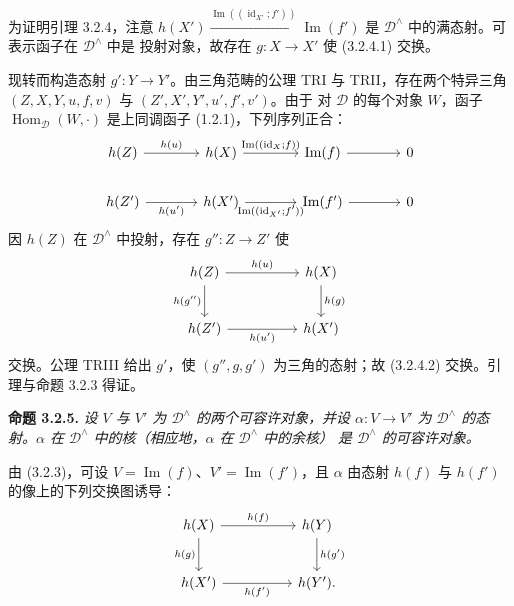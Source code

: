 \clearpage
{}%
\begingroup\small\setlength{\parskip}{0pt}\setlength{\emergencystretch}{1.5em}
为证明引理 3.2.4，注意
$h(X')\xrightarrow{\operatorname{Im}((\operatorname{id}_{X'};f'))}
\operatorname{Im}(f')$ 是 $\mathcal D^\wedge$ 中的满态射。可表示函子在 $\mathcal D^\wedge$ 中是
投射对象，故存在 $g\colon X\to X'$ 使 (3.2.4.1) 交换。

现转而构造态射 $g'\colon Y\to Y'$。由三角范畴的公理 TRI 与 TRII，存在两个特异三角
$(Z,X,Y,u,f,v)$ 与 $(Z',X',Y',u',f',v')$。由于
对 $\mathcal D$ 的每个对象 $W$，函子
$\operatorname{Hom}_{\mathcal D}(W,\mathord\cdot)$ 是上同调函子 (1.2.1)，下列序列正合：
\[
\begin{tikzcd}[column sep=3.7em]
h(Z)\arrow[r,"h(u)"]&h(X)\arrow[r,"\operatorname{Im}((\operatorname{id}_X;f))"]&\operatorname{Im}(f)\arrow[r]&0\\
h(Z')\arrow[r,"h(u')"']&h(X')\arrow[r,"\operatorname{Im}((\operatorname{id}_{X'};f'))"']&\operatorname{Im}(f')\arrow[r]&0
\end{tikzcd}
\]
因 $h(Z)$ 在 $\mathcal D^\wedge$ 中投射，存在 $g''\colon Z\to Z'$ 使
\[
\begin{tikzcd}[column sep=5em,row sep=2.3em]
h(Z)\arrow[r,"h(u)"]\arrow[d,"h(g'')"']&h(X)\arrow[d,"h(g)"]\\
h(Z')\arrow[r,"h(u')"']&h(X')
\end{tikzcd}
\]
交换。公理 TRIII 给出 $g'$，使 $(g'',g,g')$ 为三角的态射；故
(3.2.4.2) 交换。引理与命题 3.2.3 得证。

\medskip\noindent\textbf{命题 3.2.5.}\quad
\textit{设 $V$ 与 $V'$ 为 $\mathcal D^\wedge$ 的两个可容许对象，并设
$\alpha\colon V\to V'$ 为 $\mathcal D^\wedge$ 的态射。$\alpha$ 在
$\mathcal D^\wedge$ 中的核（相应地，$\alpha$ 在 $\mathcal D^\wedge$ 中的余核）
是 $\mathcal D^\wedge$ 的可容许对象。}

由 (3.2.3)，可设 $V=\operatorname{Im}(f)$、$V'=\operatorname{Im}(f')$，且
$\alpha$ 由态射 $h(f)$ 与 $h(f')$ 的像上的下列交换图诱导：
\[
\begin{tikzcd}[column sep=5em,row sep=2.4em]
h(X)\arrow[r,"h(f)"]\arrow[d,"h(g)"']&h(Y)\arrow[d,"h(g')"]\\
h(X')\arrow[r,"h(f')"']&h(Y').
\end{tikzcd}
\]
\endgroup
